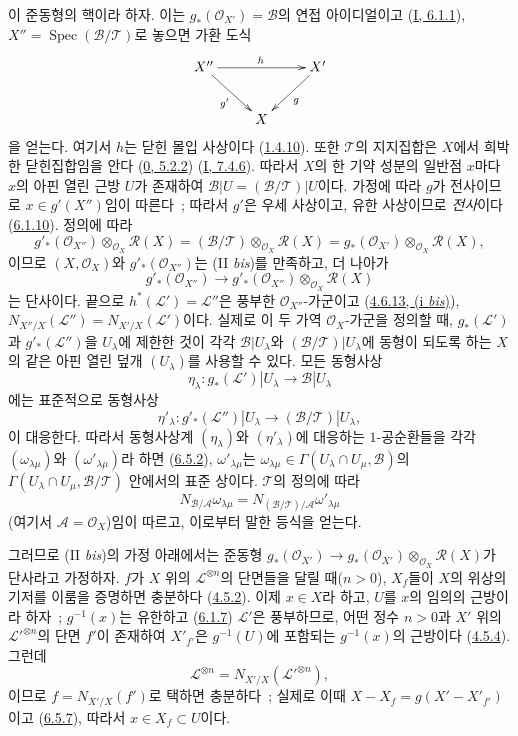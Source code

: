이 준동형의 핵이라 하자. 이는
$g_*(\mathcal{O}_{X'})=\mathcal{B}$의 연접 아이디얼이고
(\hyperref[I.6.1.1-ko]{I, 6.1.1}),
$X''=\operatorname{Spec}(\mathcal{B}/\mathcal{T})$로 놓으면 가환 도식
\[
\xymatrix{
X''\ar[rr]^h\ar[dr]_{g'} && X'\ar[dl]^g\\
& X
}
\]
을 얻는다. 여기서 $h$는 닫힌 몰입 사상이다
(\hyperref[II.1.4.10-ko]{1.4.10}). 또한 $\mathcal{T}$의 지지집합은
$X$에서 희박한 닫힌집합임을 안다
(\hyperref[0.5.2.2-ko]{0, 5.2.2})
(\hyperref[I.7.4.6-ko]{I, 7.4.6}). 따라서 $X$의 한 기약 성분의 일반점
$x$마다 $x$의 아핀 열린 근방 $U$가 존재하여
$\mathcal{B}|U=(\mathcal{B}/\mathcal{T})|U$이다. 가정에 따라 $g$가
전사이므로 $x\in g'(X'')$임이 따른다~; 따라서 $g'$은 우세 사상이고,
유한 사상이므로 \emph{전사}이다
(\hyperref[II.6.1.10-ko]{6.1.10}). 정의에 따라
\[
g'_*(\mathcal{O}_{X''})\otimes_{\mathcal{O}_X}\mathcal{R}(X)
=(\mathcal{B}/\mathcal{T})\otimes_{\mathcal{O}_X}\mathcal{R}(X)
=g_*(\mathcal{O}_{X'})\otimes_{\mathcal{O}_X}\mathcal{R}(X),
\]
이므로 $(X,\mathcal{O}_X)$와 $g'_*(\mathcal{O}_{X''})$는
(II \emph{bis})를 만족하고, 더 나아가
\[
g'_*(\mathcal{O}_{X''})\longrightarrow
g'_*(\mathcal{O}_{X''})\otimes_{\mathcal{O}_X}\mathcal{R}(X)
\]
는 단사이다. 끝으로 $h^*(\mathcal{L}')=\mathcal{L}''$은 풍부한
$\mathcal{O}_{X''}$-가군이고
(\hyperref[II.4.6.13-ko]{4.6.13, (i \emph{bis})}),
$N_{X''/X}(\mathcal{L}'')=N_{X'/X}(\mathcal{L}')$이다. 실제로 이 두
가역 $\mathcal{O}_X$-가군을 정의할 때, $g_*(\mathcal{L}')$과
$g'_*(\mathcal{L}'')$을 $U_\lambda$에 제한한 것이 각각
$\mathcal{B}|U_\lambda$와
$(\mathcal{B}/\mathcal{T})|U_\lambda$에 동형이 되도록 하는 $X$의 같은
아핀 열린 덮개 $(U_\lambda)$를 사용할 수 있다. 모든 동형사상
\[
\eta_\lambda:g_*(\mathcal{L}')|U_\lambda\longrightarrow
\mathcal{B}|U_\lambda
\]
에는 표준적으로 동형사상
\[
\eta'_\lambda:g'_*(\mathcal{L}'')|U_\lambda\longrightarrow
(\mathcal{B}/\mathcal{T})|U_\lambda,
\]
이 대응한다. 따라서 동형사상계 $(\eta_\lambda)$와
$(\eta'_\lambda)$에 대응하는 $1$-공순환들을 각각
$(\omega_{\lambda\mu})$와 $(\omega'_{\lambda\mu})$라 하면
(\hyperref[II.6.5.2-ko]{6.5.2}), $\omega'_{\lambda\mu}$는
$\omega_{\lambda\mu}\in
\Gamma(U_\lambda\cap U_\mu,\mathcal{B})$의
$\Gamma(U_\lambda\cap U_\mu,\mathcal{B}/\mathcal{T})$ 안에서의 표준
상이다. $\mathcal{T}$의 정의에 따라
\[
N_{\mathcal{B}/\mathcal{A}}\omega_{\lambda\mu}
=N_{(\mathcal{B}/\mathcal{T})/\mathcal{A}}\omega'_{\lambda\mu}
\]
(여기서 $\mathcal{A}=\mathcal{O}_X$)임이 따르고, 이로부터 말한 등식을
얻는다.

그러므로 (II \emph{bis})의 가정 아래에서는 준동형
$g_*(\mathcal{O}_{X'})\to
g_*(\mathcal{O}_{X'})\otimes_{\mathcal{O}_X}\mathcal{R}(X)$가
단사라고 가정하자. $f$가 $X$ 위의 $\mathcal{L}^{\otimes n}$의 단면들을
달릴 때($n>0$), $X_f$들이 $X$의 위상의 기저를 이룸을 증명하면
충분하다 (\hyperref[II.4.5.2-ko]{4.5.2}). 이제 $x\in X$라 하고,
$U$를 $x$의 임의의 근방이라 하자~; $g^{-1}(x)$는 유한하고
(\hyperref[II.6.1.7-ko]{6.1.7}) $\mathcal{L}'$은 풍부하므로, 어떤 정수
$n>0$과 $X'$ 위의 ${\mathcal{L}'}^{\otimes n}$의 단면 $f'$이 존재하여
$X'_{f'}$은 $g^{-1}(U)$에 포함되는 $g^{-1}(x)$의 근방이다
(\hyperref[II.4.5.4-ko]{4.5.4}). 그런데
\[
\mathcal{L}^{\otimes n}=N_{X'/X}({\mathcal{L}'}^{\otimes n}),
\]
이므로 $f=N_{X'/X}(f')$로 택하면 충분하다~; 실제로 이때
$X-X_f=g(X'-X'_{f'})$이고
(\hyperref[II.6.5.7-ko]{6.5.7}), 따라서 $x\in X_f\subset U$이다.

